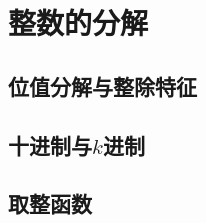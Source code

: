 \section{整数的分解}
\subsection{位值分解与整除特征}
\clearpage
\subsection{十进制与\texorpdfstring{\(k\)}k进制}
\clearpage
\subsection{取整函数}
\clearpage
